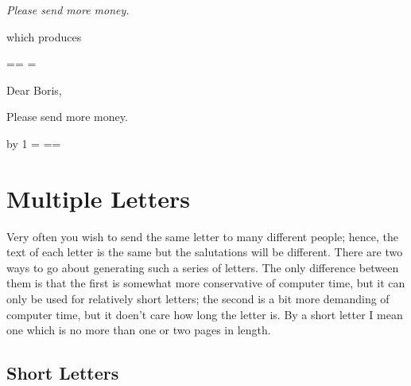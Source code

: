{\it  Please send more money.}
 
 
 
\tcon{\\endletter}
\tcon{\\end}
which produces
 
\lastpage=\pagenumber \lastchap=\chapternumber
\lastsection=\sectionnumber \let\lastchapterlabel=\chapterlabel
\endpage
 
{}
Dear Boris,
 
     Please send more money.
 
 
 
\endletter
 
 
\papers \advance\lastpage by 1 \pagenumber=\lastpage
\chapternumber=\lastchap \sectionnumber=\lastsection
\let\chapterlabel=\lastchapterlabel
 
 
\section{Multiple Letters}
 
Very often you wish to send the same letter to many different
people; hence, the text of each letter is the same but the
salutations will be different.
There are two ways to go about generating such a series of letters.
The only difference between them is that the first is somewhat
more conservative of computer time, but it can only be used for
relatively short letters; the second is a bit more demanding of
computer time, but it doen't care how long the letter is.
By a short letter I mean one which is no more than
one or two pages in length.
 
\subsection{Short Letters}
 

